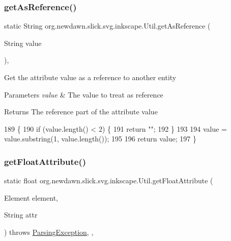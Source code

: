\subsubsection{\texorpdfstring{get\+As\+Reference()}{getAsReference()}}
{\footnotesize\ttfamily static String org.\+newdawn.\+slick.\+svg.\+inkscape.\+Util.\+get\+As\+Reference (\begin{DoxyParamCaption}\item[{String}]{value }\end{DoxyParamCaption})\hspace{0.3cm}{\ttfamily [inline]}, {\ttfamily [static]}}

Get the attribute value as a reference to another entity


\begin{DoxyParams}{Parameters}
{\em value} & The value to treat as reference \\
\hline
\end{DoxyParams}
\begin{DoxyReturn}{Returns}
The reference part of the attribute value 
\end{DoxyReturn}

\begin{DoxyCode}
189                                                       \{
190         \textcolor{keywordflow}{if} (value.length() < 2) \{
191             \textcolor{keywordflow}{return} \textcolor{stringliteral}{""};
192         \}
193         
194         value = value.substring(1, value.length());
195         
196         \textcolor{keywordflow}{return} value;
197     \}
\end{DoxyCode}
\mbox{\label{classorg_1_1newdawn_1_1slick_1_1svg_1_1inkscape_1_1_util_a263828dc423a571645718f7413f83cf9}} 
\subsubsection{\texorpdfstring{get\+Float\+Attribute()}{getFloatAttribute()}}
{\footnotesize\ttfamily static float org.\+newdawn.\+slick.\+svg.\+inkscape.\+Util.\+get\+Float\+Attribute (\begin{DoxyParamCaption}\item[{Element}]{element,  }\item[{String}]{attr }\end{DoxyParamCaption}) throws \mbox{\hyperlink{classorg_1_1newdawn_1_1slick_1_1svg_1_1_parsing_exception}{Parsing\+Exception}}\hspace{0.3cm}{\ttfamily [inline]}, {\ttfamily [static]}, {\ttfamily [package]}}

